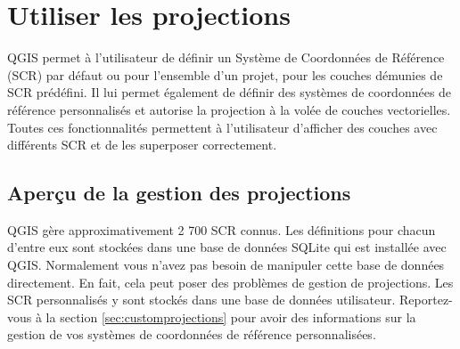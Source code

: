 \section{Utiliser les projections}\label{label_projections}


QGIS permet à l'utilisateur de définir un Système de Coordonnées de Référence 
(SCR) par défaut ou pour l'ensemble d'un projet, pour les couches démunies de 
SCR prédéfini. Il lui permet également de définir des systèmes de coordonnées 
de référence personnalisés et autorise la projection à la volée de couches 
vectorielles. Toutes ces fonctionnalités permettent à l'utilisateur d'afficher 
des couches avec différents SCR et de les superposer correctement.

\subsection{Aperçu de la gestion des projections}\label{label_projoverview}

QGIS gère approximativement 2 700 SCR connus. Les définitions pour
chacun d'entre eux sont stockées dans une base de données SQLite qui est
installée avec QGIS. Normalement vous n'avez pas besoin de manipuler cette 
base de données directement. En fait, cela peut poser des problèmes de
gestion de projections. Les SCR personnalisés y sont stockés dans une
base de données utilisateur. Reportez-vous à la section \ref{sec:customprojections} 
pour avoir des informations sur la gestion de vos systèmes de coordonnées de
référence personnalisées.

